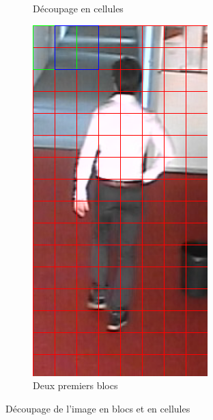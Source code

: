 \documentclass[12pt]{article}
\begin{document}
\begin{figure}[!ht]
\begin{subfigure}{.3\textwidth}
  \caption{Découpage en cellules}
  \label{fig:kernel_sy}
\end{subfigure}
\begin{subfigure}{.3\textwidth}
  \centering
  \includegraphics[width=.5\linewidth]{img/block.png}
  \caption{Deux premiers blocs}
  \label{fig:kernel_sy}
\end{subfigure}
\caption{Découpage de l'image en blocs et en cellules}
\label{fig:kernels}
\end{figure}
\end{document}
